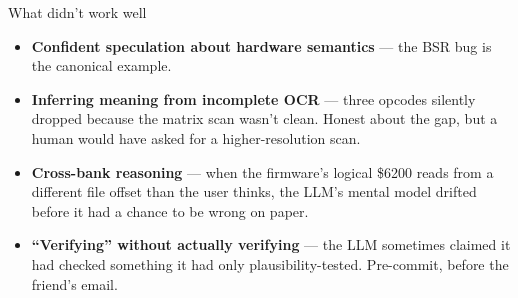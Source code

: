 \documentclass[aspectratio=169,11pt]{beamer}
\begin{document}
\begin{frame}{What didn't work well}
\begin{itemize}
  \item \textbf{Confident speculation about hardware semantics} ---
        the BSR bug is the canonical example.
  \item \textbf{Inferring meaning from incomplete OCR} --- three
        opcodes silently dropped because the matrix scan wasn't
        clean. Honest about the gap, but a human would have asked for
        a higher-resolution scan.
  \item \textbf{Cross-bank reasoning} --- when the firmware's logical
        \$6200 reads from a different file offset than the user
        thinks, the LLM's mental model drifted before it had a chance
        to be wrong on paper.
  \item \textbf{``Verifying'' without actually verifying} --- the LLM
        sometimes claimed it had checked something it had only
        plausibility-tested. Pre-commit, before the friend's email.
\end{itemize}
\end{frame}
\end{document}
